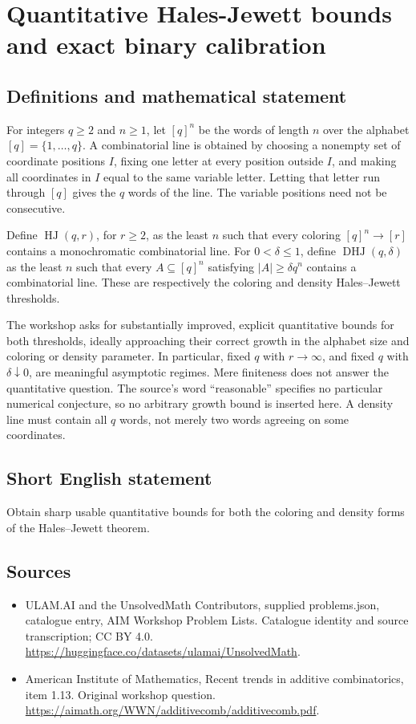 \documentclass[11pt,a4paper]{article}
\begin{document}
\section*{Quantitative Hales-Jewett bounds and exact binary calibration}\label{statement}

\subsection{Definitions and mathematical statement}
For integers $q\ge2$ and $n\ge1$, let $[q]^n$ be the words of length
$n$ over the alphabet $[q]=\{1,\ldots,q\}$. A combinatorial line
is obtained by choosing a nonempty set of coordinate positions $I$,
fixing one letter at every position outside $I$, and making all
coordinates in $I$ equal to the same variable letter. Letting that
letter run through $[q]$ gives the $q$ words of the line.
The variable positions need not be consecutive.

Define $\operatorname{HJ}(q,r)$, for $r\ge2$, as the least $n$ such
that every coloring $[q]^n\to[r]$ contains a monochromatic
combinatorial line. For $0<\delta\le1$, define
$\operatorname{DHJ}(q,\delta)$ as the least $n$ such that every
$A\subseteq[q]^n$ satisfying $|A|\ge\delta q^n$ contains a
combinatorial line. These are respectively the coloring and density
Hales--Jewett thresholds.

The workshop asks for substantially improved, explicit quantitative
bounds for both thresholds, ideally approaching their correct growth
in the alphabet size and coloring or density parameter. In particular,
fixed $q$ with $r\to\infty$, and fixed $q$ with $\delta\downarrow0$,
are meaningful asymptotic regimes. Mere finiteness does not answer
the quantitative question. The source's word ``reasonable'' specifies
no particular numerical conjecture, so no arbitrary growth bound is
inserted here. A density line must contain all $q$ words, not merely
two words agreeing on some coordinates.
\subsection{Short English statement}
Obtain sharp usable quantitative bounds for both the coloring and density forms of the Hales–Jewett theorem.
\subsection{Sources}
\begin{itemize}
\item[S1] ULAM.AI and the UnsolvedMath Contributors, supplied problems.json, catalogue entry, AIM Workshop Problem Lists. Catalogue identity and source transcription; CC BY 4.0.
\url{https://huggingface.co/datasets/ulamai/UnsolvedMath}.
\item[S2] American Institute of Mathematics, Recent trends in additive combinatorics, item 1.13. Original workshop question.
\url{https://aimath.org/WWN/additivecomb/additivecomb.pdf}.
\end{itemize}
\end{document}

